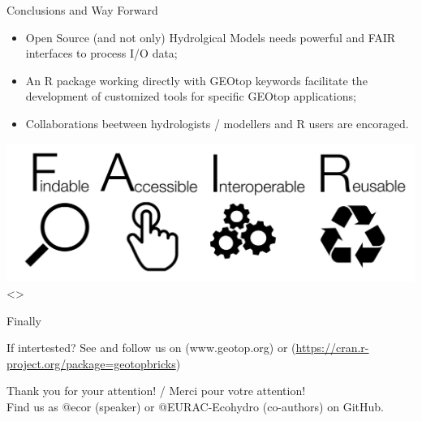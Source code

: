 \documentclass[ignorenonframetext,]{beamer}
\begin{document}
\begin{frame}{Conclusions and Way Forward}

\begin{itemize}
\item
  Open Source (and not only) Hydrolgical Models needs powerful and FAIR
  interfaces to process I/O data;
\item
  An R package working directly with GEOtop keywords facilitate the
  development of customized tools for specific GEOtop applications;
\item
  Collaborations beetween hydrologists / modellers and R users are
  encoraged.
\end{itemize}

\includegraphics{resources/images/FAIR_data_principles.jpg}\textless{}\center\textgreater{}

\end{frame}

\begin{frame}{Finally}

If intertested? See and follow us on (www.geotop.org) or
(\url{https://cran.r-project.org/package=geotopbricks})

Thank you for your attention! / Merci pour votre attention!\\
Find us as @ecor (speaker) or @EURAC-Ecohydro (co-authors) on GitHub.

\end{frame}
\end{document}
